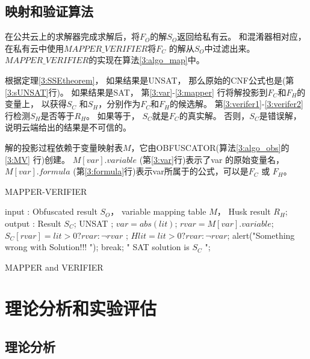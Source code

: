\subsection{映射和验证算法}\label{3:mappping}
在公共云上的求解器完成求解后，将$F_O$的解$S_O$返回给私有云。
和混淆器相对应，在私有云中使用$MAPPER\_VERIFIER$将$F_C$ 的解从$S_O$中过滤出来。
$MAPPER\_VERIFIER$的实现在算法\ref{3:algo_map}中。

根据定理\ref{3:SSEtheorem}，
如果结果是UNSAT， 那么原始的CNF公式也是(第\ref{3:sUNSAT}行)。
如果结果是SAT， 第\ref{3:var}-\ref{3:mapper} 行将解投影到$F_C$和$F_H$的变量上，
以获得$S_C$ 和$S_H$，分别作为$F_C$和$F_H$的候选解。
第\ref{3:verifer1}-\ref{3:verifer2} 行检测$S_H$是否等于$R_H$。
如果等于， $S_C$就是$F_C$的真实解。
否则，$S_C$是错误解，说明云端给出的结果是不可信的。

解的投影过程依赖于变量映射表$M$，它由OBFUSCATOR(算法\ref{3:algo_obs}的\ref{3:MV} 行)创建。
$M[var].variable$ (第\ref{3:var}行)表示了var 的原始变量名，
$M[var].formula$ (第\ref{3:formula}行)表示var所属于的公式，可以是$F_C$ 或 $F_H$。

\begin{algorithm}[t]
\caption{MAPPER-VERIFIER}
\label{3:algo_map}
\begin{algorithmic}[1]
\STATE input : Obfuscated result $S_O$， variable mapping table $M$， Husk result $R_H$;
\STATE output : Result $S_C$;
 \label{3:sUNSAT}
\RETURN UNSAT ;
\ENDIF
{}
\STATE $var=abs(lit)$;
\STATE $rvar=M[var].variable $;\label{3:var}
  \label{3:formula}
\STATE $S_C[rvar]=lit>0?rvar:\neg rvar$ ; \label{3:mapper}
\ELSE
\STATE $Hlit=lit>0?rvar:\neg rvar$;\label{3:verifer1}
\STATE    alert("Something wrong with Solution!!! "); \label{3:Warning}
\STATE    break;
\ENDIF
\ENDIF
\label{3:verifer2}
\ENDFOR
\PRINT " SAT  solution is $S_C$ ";
\caption{MAPPER and VERIFIER}
\end{algorithmic}
\end{algorithm}





\section{理论分析和实验评估}
\subsection{理论分析}
